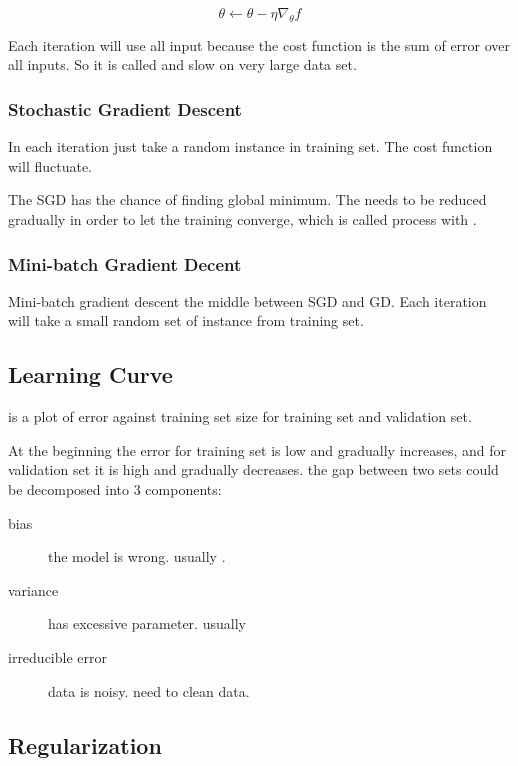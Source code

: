 \begin{equation}\label{gdlearning}
	\theta \gets \theta - \eta \nabla_\theta f
\end{equation}

Each iteration will use all input because the cost function is the sum of error over all inputs. So it is called  and slow on very large data set.

\subsubsection{Stochastic Gradient Descent}

In each iteration just take a random instance in training set. The cost function will fluctuate. 

The SGD has the chance of finding global minimum. The  needs to be reduced gradually in order to let the training converge, which is called  process with .

\subsubsection{Mini-batch Gradient Decent}

Mini-batch gradient descent the middle between SGD and GD. Each iteration will take a small random set of instance from training set.


\subsection{Learning Curve}

 is a plot of error against training set size for training set and validation set. 

At the beginning the error for training set is low and gradually increases, and for validation set it is high and gradually decreases. the gap between two sets could be decomposed into 3 components:
\begin{description}
	\item [bias] the model is wrong. usually .
	\item [variance] has excessive parameter. usually 
	\item [irreducible error] data is noisy. need to clean data.
\end{description}


\subsection{Regularization}


